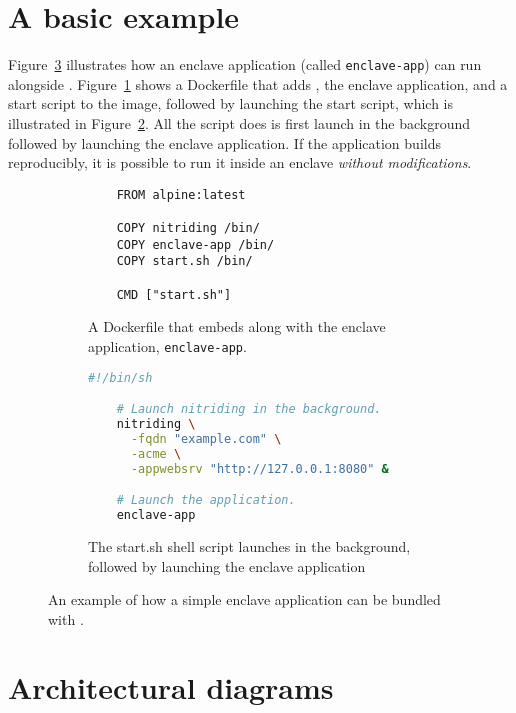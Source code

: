 \section{A basic example}%
\label{sec:example}

Figure~\ref{fig:example} illustrates how an enclave application (called
\texttt{enclave-app}) can run alongside \tool{}.  Figure~\ref{fig:dockerfile}
shows a Dockerfile that adds \tool{}, the enclave application, and a start
script to the image, followed by launching the start script, which is
illustrated in Figure~\ref{fig:start}.  All the script does is first launch
\tool{} in the background followed by launching the enclave application.  If
the application builds reproducibly, it is possible to run it inside an enclave
\emph{without modifications}.

\begin{figure}
  \begin{subfigure}[b]{\linewidth}
    \centering
    \begin{lstlisting}
    FROM alpine:latest

    COPY nitriding /bin/
    COPY enclave-app /bin/
    COPY start.sh /bin/

    CMD ["start.sh"]\end{lstlisting}
    \caption{A Dockerfile that embeds \tool{} along with the enclave
      application, \texttt{enclave-app}.}%
    \label{fig:dockerfile}
  \end{subfigure}

  \begin{subfigure}[b]{\linewidth}
    \centering
    \begin{lstlisting}[language=bash]
    #!/bin/sh

    # Launch nitriding in the background.
    nitriding \
      -fqdn "example.com" \
      -acme \
      -appwebsrv "http://127.0.0.1:8080" &

    # Launch the application.
    enclave-app\end{lstlisting}
    \caption{The start.sh shell script launches \tool{} in the background,
    followed by launching the enclave application}%
    \label{fig:start}
  \end{subfigure}

  \caption{An example of how a simple enclave application can be bundled with
  \tool.}%
  \label{fig:example}
\end{figure}

\section{Architectural diagrams}%
\label{sec:more-diagrams}

